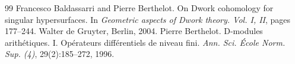 \documentclass[10pt,a4paper]{amsart}
\numberwithin{equation}{section}
\theoremstyle{plain}
\theoremstyle{definition}
\theoremstyle{plain}
\begin{document}
\begin{thebibliography}{99}
 Francesco Baldassarri and Pierre Berthelot. On {D}work cohomology for singular hypersurfaces. In {\em Geometric aspects of {D}work theory. {V}ol. {I}, {II}}, pages 177--244. Walter de Gruyter, Berlin, 2004.
 Pierre Berthelot. {D}-modules arith\'etiques. {I}. {O}p\'erateurs diff\'erentiels de niveau fini. {\em Ann. Sci. \'Ecole Norm. Sup. (4)}, 29(2):185--272, 1996.
\end{thebibliography}
\end{document}
